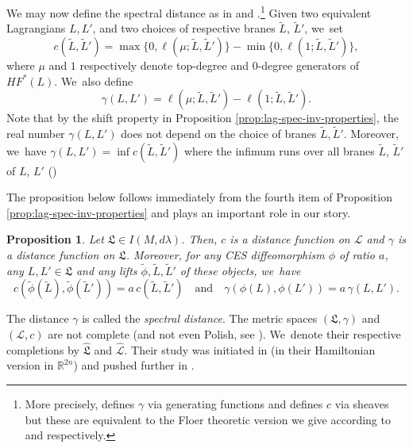 \documentclass[10pt,a4paper]{amsart}
\newtheorem{prop}[thm]{Proposition}
\theoremstyle{definition}
\newcommand {\LL}{{\mathcal L}}
\newcommand{\R}{\mathbb{R}}
\newcommand{\fL}{\mathfrak {L}}
\newcommand{\hatL}{\widehat{\fL}}
\newcommand{\hatLL}{\widehat{\LL}}
\begin{document}
We may now define the spectral distance as in \cite{Viterbo-STAGGF} and \cite{Viterbo-gammas}.\footnote{More precisely, \cite{Viterbo-STAGGF} defines $\gamma$ via generating functions and \cite{Viterbo-gammas} defines $c$ via sheaves but these are equivalent to the Floer theoretic version we give according to \cite{Milinkovic-Oh} and \cite{Viterbo-Sheaves} respectively.}
Given two equivalent Lagrangians $L, L'$, and two choices of respective branes $\tilde L$, $\tilde L'$, we~set
\begin{equation*}
c(\tilde L,\tilde L')=\max\{0, \ell(\mu; \tilde L, \tilde L')\}- \min \{0,\ell(1; \tilde L,\tilde L')\},
\end{equation*}
where $\mu$ and $1$ respectively denote top-degree and $0$-degree generators of $HF^*(L)$. We~also define
\begin{equation*}
\gamma(L,L')=\ell(\mu; \tilde L, \tilde L')-\ell(1; \tilde L,\tilde L').
\end{equation*}
Note that by the shift property in Proposition \ref{prop:lag-spec-inv-properties}, the real number $\gamma(L,L')$ does not depend on the choice of branes $\tilde L, \tilde L'$. Moreover, we~have $\gamma(L, L')=\inf c(\tilde L, \tilde L')$ where the infimum runs over all branes $\tilde L$, $\tilde L'$ of $L$, $L'$ (\cite[Prop.\,5.2]{Viterbo-gammas})

The proposition below follows immediately from the fourth item of Proposition \ref{prop:lag-spec-inv-properties} and plays an important role in our story.

\begin{prop}\label{prop:gamma} Let $\fL\in I(M, d\lambda)$. Then, $c$ is a distance function on $\LL$ and $\gamma$ is a distance function on $\fL$. Moreover, for any CES diffeomorphism $\phi$ of ratio $a$, any $L, L'\in\fL$ and any lifts $\tilde \phi, \tilde L, \tilde L'$ of these objects, we~have
\begin{equation*}
c(\tilde \phi (\tilde L), \tilde \phi(\tilde L'))=a\, c(\tilde L,\tilde L')\quad \text{and}\quad \gamma(\phi(L), \phi(L'))=a\,\gamma(L, L').
\end{equation*}
\end{prop}

The distance $\gamma$ is called the \emph{spectral distance}. The metric spaces $(\fL,\gamma)$ and $(\LL,c)$ are not complete (and not even Polish, see \cite[Prop.\,A.1]{Viterbo-gammas}). We~denote their respective completions by $\hatL$ and $\hatLL$. Their study was initiated in \cite{Humiliere-completion} (in their Hamiltonian version in $\R^{2n}$) and pushed further in \cite{Viterbo-gammas}.
\end{document}
